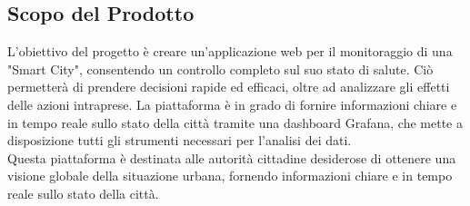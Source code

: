 \subsection{Scopo del Prodotto}
L'obiettivo del progetto è creare un'applicazione web per il monitoraggio di una "Smart City", consentendo un controllo completo sul suo stato di salute. Ciò permetterà di prendere decisioni rapide ed efficaci, oltre ad analizzare gli effetti delle azioni intraprese. La piattaforma è in grado di fornire informazioni chiare e in tempo reale sullo stato della città tramite una dashboard Grafana, che mette a disposizione tutti gli strumenti necessari per l'analisi dei dati. \\
Questa piattaforma è destinata alle autorità cittadine desiderose di ottenere una visione globale della situazione urbana, fornendo informazioni chiare e in tempo reale sullo stato della città.